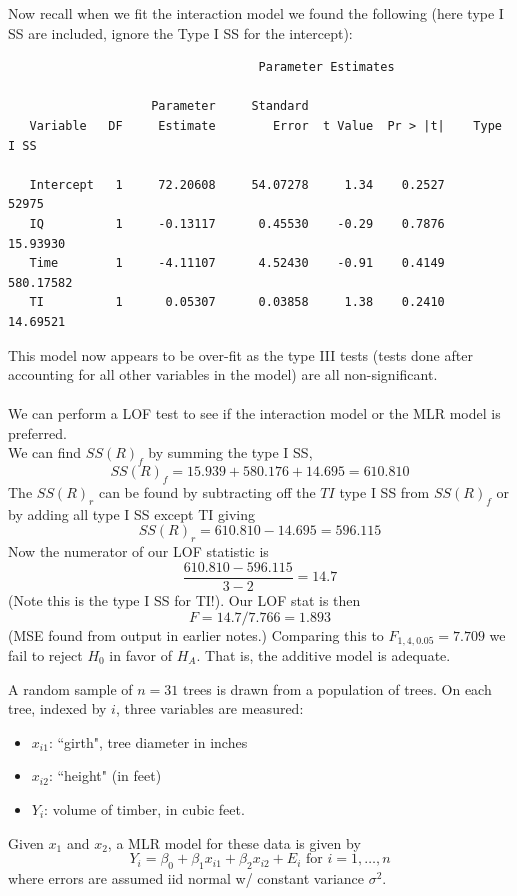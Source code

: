 \documentclass{report}
\begin{document}
Now recall when we fit the interaction model we found the following (here type I SS are included, ignore the Type I SS for the intercept):
\begin{small}
\begin{verbatim}
                                   Parameter Estimates
 
                    Parameter     Standard
   Variable   DF     Estimate        Error  t Value  Pr > |t|    Type I SS   

   Intercept   1     72.20608     54.07278     1.34    0.2527        52975     
   IQ          1     -0.13117      0.45530    -0.29    0.7876     15.93930      
   Time        1     -4.11107      4.52430    -0.91    0.4149    580.17582      
   TI          1      0.05307      0.03858     1.38    0.2410     14.69521     
\end{verbatim}
\end{small}
This model now appears to be over-fit as the type III tests (tests done after accounting for all other variables in the model) are all non-significant.\\~\\
We can perform a LOF test to see if the interaction model or the MLR model is preferred.	\\
We can find $SS(R)_f$ by summing the type I SS, $$SS(R)_f=15.939+580.176+14.695=610.810$$
The $SS(R)_r$ can be found by subtracting off the $TI$ type I SS from $SS(R)_f$ or by adding all type I SS except TI giving
$$SS(R)_r=610.810-14.695=596.115$$
Now the numerator of our LOF statistic is
$$\frac{610.810-596.115}{3-2}=14.7$$
(Note this is the type I SS for TI!).  Our LOF stat is then
$$F=14.7/7.766	=1.893$$
(MSE found from output in earlier notes.)  Comparing this to  $F_{1,4,0.05}=7.709$ we fail to reject $H_0$ in favor of $H_A$.  That is, the additive model is adequate.

\newpage

A random sample of $n=31$ trees is drawn from a population of trees.  On each tree, indexed by $i$, three variables are measured:
\begin{itemize}
\item $x_{i1}$: ``girth", tree diameter in inches
\item $x_{i2}$: ``height" (in feet)
\item $Y_{i}$: volume of timber, in cubic feet.
\end{itemize}

Given $x_1$ and $x_2$, a MLR model for these data is given by 
$$ Y_i = \beta_0 + \beta_1 x_{i1} + \beta_2 x_{i2} + E_i \mbox{ for }i=1,\ldots,n$$ 
where errors are assumed iid normal w/ constant variance $\sigma^2$.
\bigskip
\par\noindent
\end{document}
